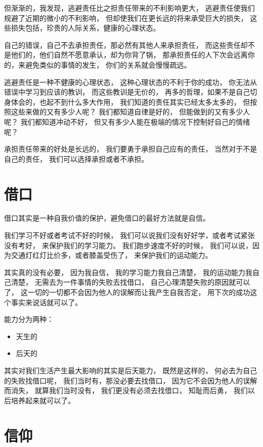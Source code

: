 但渐渐的，我发现，逃避责任比之担责任带来的不利影响更大，
逃避责任使我们规避了近期的微小的不利影响，
但却使我们在更长远的将来承受巨大的损失，
这些损失包括，珍贵的人际关系，健康的心理状态。


自己的错误，自己不去承担责任，那必然有其他人来承担责任，
而这些责任却不是他们的，他们自然不愿意承认，却为你背了锅，
那承担责任的人下次会远离你的，来避免类似的事情的发生，
你们的关系就会慢慢疏远。

逃避责任是一种不健康的心理状态，
这种心理状态的不利于你的成功，
你无法从错误中学习到应该的教训，
而这些教训是无价的，
再多的哲理，如果不是自己切身体会的，也起不到什么多大作用，
我们知道的责任其实已经太多太多的，
但按照这些来做的又有多少人呢？
我们都知道自律是好的，
但能做到的又有多少人呢？
我们都知道冲动不好，
但又有多少人能在极端的情况下控制好自己的情绪呢？

承担责任带来的好处是长远的，
我们要勇于承担自己应有的责任，
当然对于不是自己的责任，
我们可以选择承担或者不承担。

\section{借口}

借口其实是一种自我价值的保护，避免借口的最好方法就是自信。


我们学习不好或者考试不好的时候，
我们可以说我们没有好好学，或者考试紧张没有考好，
来保护我们的学习能力。
我们跑步速度不好的时候，
我们可以说，因为交通灯红灯比价多，或者膝盖受伤了，
来保护我们的运动能力。

其实真的没有必要，
因为我自信，
我的学习能力我自己清楚，
我的运动能力我自己清楚，
无需去为一件事情的失败去找借口，
自己心理清楚失败的原因就可以了，
这一切的一切都不会因为他人的误解而让我产生自我否定，
用下次的成功这个事实来说话就可以了。


能力分为两种：
\begin{itemize}
\item 天生的
\item 后天的
\end{itemize}

其实对我们生活产生最大影响的其实是后天能力，
既然是这样的，
何必去为自己的失败找借口呢，
我们当时有，那没必要去找借口，
因为它不会因为他人的误解而消失，
就算我们当时没有，
我们更没有必须去找借口，
知耻而后勇，
我们以后培养起来就可以了。



\section{信仰}

